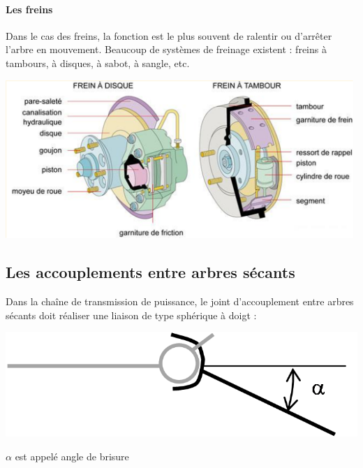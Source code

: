 \documentclass[11pt,oneside]{article}
\begin{document}
\paragraph{Les freins}

Dans le cas des freins, la fonction est le plus souvent de ralentir ou d’arrêter l’arbre en mouvement. Beaucoup de systèmes de freinage existent : freins à tambours, à disques, à sabot, à sangle, etc.

\begin{center}
\includegraphics[height=6cm]{png/fig_33}
\end{center}



\subsection{Les accouplements entre arbres sécants}
Dans la chaîne de transmission de puissance, le joint d’accouplement entre arbres sécants doit réaliser une liaison de type sphérique à doigt :

\begin{minipage}[c]{.45\linewidth}
\begin{center}
\includegraphics[width=\textwidth]{png/fig_34}
\end{center}
\end{minipage} \hfill
\begin{minipage}[c]{.45\linewidth}
$\alpha$ est appelé angle de brisure
\end{minipage}
\end{document}
